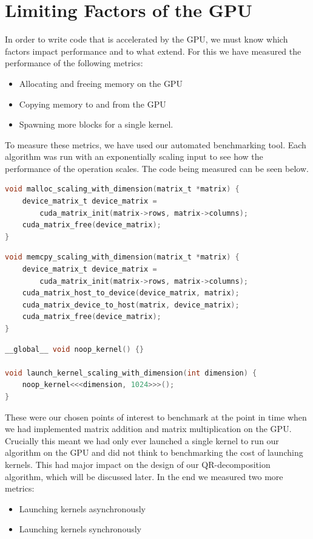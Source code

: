 \section{Limiting Factors of the GPU}

In order to write code that is accelerated by the GPU, we must know which factors impact performance and to what extend. 
For this we have measured the performance of the following metrics: 

\begin{itemize}
    \item Allocating and freeing memory on the GPU
    \item Copying memory to and from the GPU
    \item Spawning more blocks for a single kernel.
\end{itemize}

To measure these metrics, we have used our automated benchmarking tool. Each algorithm was run with an exponentially scaling input to see how the performance of the operation scales. The code being measured can be seen below.

\begin{lstlisting}[language=C, caption={Code to measure allocating and freeing memory}, label={lst:cudaMalloc}]
void malloc_scaling_with_dimension(matrix_t *matrix) {
    device_matrix_t device_matrix =
        cuda_matrix_init(matrix->rows, matrix->columns);
    cuda_matrix_free(device_matrix);
}
\end{lstlisting}


\begin{lstlisting}[language=C, caption={Code to measure moving memory}, label={lst:cudaMemcopy}]
void memcpy_scaling_with_dimension(matrix_t *matrix) {
    device_matrix_t device_matrix =
        cuda_matrix_init(matrix->rows, matrix->columns);
    cuda_matrix_host_to_device(device_matrix, matrix);
    cuda_matrix_device_to_host(matrix, device_matrix);
    cuda_matrix_free(device_matrix);
}
\end{lstlisting}

\begin{lstlisting}[language=C, caption={Code to measure spawning more blocks}, label={lst:noop}]
__global__ void noop_kernel() {}

void launch_kernel_scaling_with_dimension(int dimension) {
    noop_kernel<<<dimension, 1024>>>();
}
\end{lstlisting}

These were our chosen points of interest to benchmark at the point in time when we had implemented matrix addition and matrix multiplication on the GPU. 
Crucially this meant we had only ever launched a single kernel to run our algorithm on the GPU and did not think to benchmarking the cost of launching kernels. 
This had major impact on the design of our QR-decomposition algorithm, which will be discussed later. 
In the end we measured two more metrics:
\begin{itemize}
    \item Launching kernels asynchronously
    \item Launching kernels synchronously
\end{itemize}

